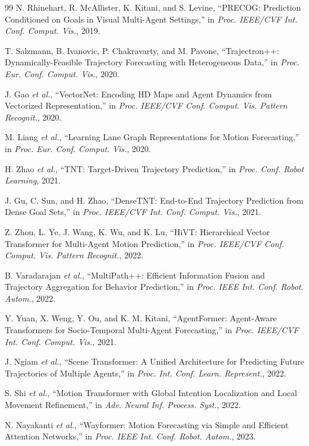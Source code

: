 \documentclass[10pt,journal,compsoc]{IEEEtran}
\begin{document}
\begin{thebibliography}{99}
N. Rhinehart, R. McAllister, K. Kitani, and S. Levine, ``PRECOG: Prediction Conditioned on Goals in Visual Multi-Agent Settings,'' in \emph{Proc. IEEE/CVF Int. Conf. Comput. Vis.}, 2019.

T. Salzmann, B. Ivanovic, P. Chakravarty, and M. Pavone, ``Trajectron++: Dynamically-Feasible Trajectory Forecasting with Heterogeneous Data,'' in \emph{Proc. Eur. Conf. Comput. Vis.}, 2020.

J. Gao \emph{et al.}, ``VectorNet: Encoding HD Maps and Agent Dynamics from Vectorized Representation,'' in \emph{Proc. IEEE/CVF Conf. Comput. Vis. Pattern Recognit.}, 2020.

M. Liang \emph{et al.}, ``Learning Lane Graph Representations for Motion Forecasting,'' in \emph{Proc. Eur. Conf. Comput. Vis.}, 2020.

H. Zhao \emph{et al.}, ``TNT: Target-Driven Trajectory Prediction,'' in \emph{Proc. Conf. Robot Learning}, 2021.

J. Gu, C. Sun, and H. Zhao, ``DenseTNT: End-to-End Trajectory Prediction from Dense Goal Sets,'' in \emph{Proc. IEEE/CVF Int. Conf. Comput. Vis.}, 2021.

Z. Zhou, L. Ye, J. Wang, K. Wu, and K. Lu, ``HiVT: Hierarchical Vector Transformer for Multi-Agent Motion Prediction,'' in \emph{Proc. IEEE/CVF Conf. Comput. Vis. Pattern Recognit.}, 2022.

B. Varadarajan \emph{et al.}, ``MultiPath++: Efficient Information Fusion and Trajectory Aggregation for Behavior Prediction,'' in \emph{Proc. IEEE Int. Conf. Robot. Autom.}, 2022.

Y. Yuan, X. Weng, Y. Ou, and K. M. Kitani, ``AgentFormer: Agent-Aware Transformers for Socio-Temporal Multi-Agent Forecasting,'' in \emph{Proc. IEEE/CVF Int. Conf. Comput. Vis.}, 2021.

J. Ngiam \emph{et al.}, ``Scene Transformer: A Unified Architecture for Predicting Future Trajectories of Multiple Agents,'' in \emph{Proc. Int. Conf. Learn. Represent.}, 2022.

S. Shi \emph{et al.}, ``Motion Transformer with Global Intention Localization and Local Movement Refinement,'' in \emph{Adv. Neural Inf. Process. Syst.}, 2022.

N. Nayakanti \emph{et al.}, ``Wayformer: Motion Forecasting via Simple and Efficient Attention Networks,'' in \emph{Proc. IEEE Int. Conf. Robot. Autom.}, 2023.


\end{thebibliography}
\end{document}
